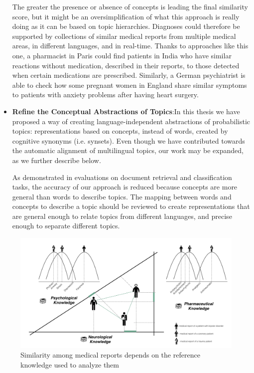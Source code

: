 \begin{itemize}
The greater the presence or absence of concepts is leading the final similarity score, but it might be an oversimplification of what this approach is really doing as it can be based on topic hierarchies. Diagnoses could therefore be supported by collections of similar medical reports from multiple medical areas, in different languages, and in real-time. Thanks to approaches like this one, a pharmacist in Paris could find patients in India who have similar reactions without medication, described in their reports, to those detected when certain medications are prescribed. Similarly, a German psychiatrist is able to check how some pregnant women in England share similar symptoms to patients with anxiety problems after having heart surgery.
\item \textbf{Refine the Conceptual Abstractions of Topics}:In this thesis we have proposed a way of creating language-independent abstractions of probabilistic topics: representations based on concepts, instead of words, created by cognitive synonyms (i.e. synsets). Even though we have contributed towards the automatic alignment of multilingual topics, our work may be expanded, as we further describe below. 

As demonstrated in evaluations on document retrieval and classification tasks, the accuracy of our approach is reduced because concepts are more general than words to describe topics. The mapping between words and concepts to describe a topic should be reviewed to create representations that are general enough to relate topics from different languages, and precise enough to separate different topics. 

\end{itemize}


\begin{figure}[ht]
    \centering
    \includegraphics[width=0.7\linewidth]{context-similarity.png}
    \caption{Similarity among medical reports depends on the reference knowledge used to analyze them}
    \label{fig:context-similarity}
\end{figure}


